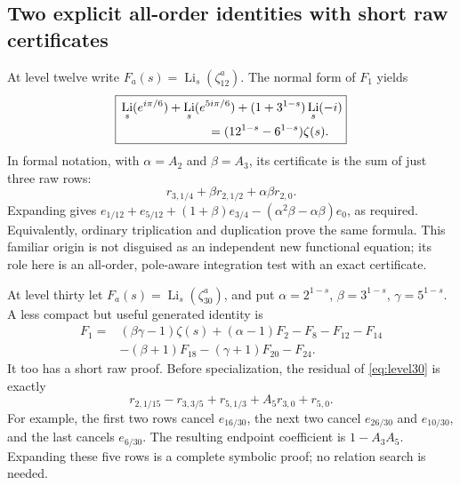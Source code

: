 \documentclass[11pt]{article}
\numberwithin{equation}{section}
\theoremstyle{definition}
\theoremstyle{remark}
\DeclareMathOperator{\Li}{Li}
\begin{document}
\subsection{Two explicit all-order identities with short raw certificates}
At level twelve write $F_a(s)=\Li_s(\zeta_{12}^a)$. The normal form of
$F_1$ yields
\begin{equation}
 \boxed{\begin{aligned}
 &\Li_s(e^{i\pi/6})+\Li_s(e^{5i\pi/6})
       +(1+3^{1-s})\Li_s(-i)\\
 &\hspace{25mm}=(12^{1-s}-6^{1-s})\zeta(s).
 \end{aligned}}
 \label{eq:level12}
\end{equation}
In formal notation, with $\alpha=A_2$ and $\beta=A_3$, its certificate
is the sum of just three raw rows:
\begin{equation}
 r_{3,1/4}+\beta r_{2,1/2}+\alpha\beta r_{2,0}.
 \label{eq:level12-cert}
\end{equation}
Expanding gives
$e_{1/12}+e_{5/12}+(1+\beta)e_{3/4}
-(\alpha^2\beta-\alpha\beta)e_0$, as required.
Equivalently, ordinary triplication and duplication prove the same
formula. This familiar origin is not disguised as an independent new
functional equation; its role here is an all-order, pole-aware
integration test with an exact certificate.

At level thirty let $F_a(s)=\Li_s(\zeta_{30}^a)$, and put
$\alpha=2^{1-s}$, $\beta=3^{1-s}$, $\gamma=5^{1-s}$.
A less compact but useful generated identity is
\begin{equation}
\begin{aligned}
 F_1={}&(\beta\gamma-1)\zeta(s)+(\alpha-1)F_2
       -F_8-F_{12}-F_{14}\\
       &-(\beta+1)F_{18}-(\gamma+1)F_{20}-F_{24}.
\end{aligned}
\label{eq:level30}
\end{equation}
It too has a short raw proof. Before specialization, the residual of
\eqref{eq:level30} is exactly
\begin{equation}
 r_{2,1/15}-r_{3,3/5}+r_{5,1/3}+A_5r_{3,0}+r_{5,0}.
 \label{eq:level30-cert}
\end{equation}
For example, the first two rows cancel $e_{16/30}$, the next two
cancel $e_{26/30}$ and $e_{10/30}$, and the last cancels $e_{6/30}$.
The resulting endpoint coefficient is $1-A_3A_5$. Expanding these five
rows is a complete symbolic proof; no relation search is needed.
\end{document}
